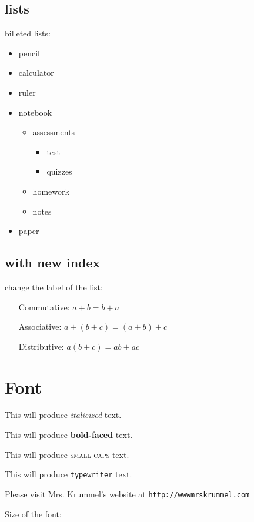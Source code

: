 \documentclass[11pt]{article}
\begin{document}
	\subsection{lists}
billeted lists: 
\begin{itemize}
	\item pencil
	\item calculator
	\item ruler
	\item notebook
		\begin{itemize}
			\item assessments
			\begin{itemize}
				\item test
				\item quizzes
			\end{itemize}
			\item homework
			\item notes
		\end{itemize}
	\item paper
\end{itemize}

	\subsection{with new index}
\begin{flushleft}
change the label of the list:
\end{flushleft}

\begin{enumerate}
\item[Commutative:] $a+b=b+a$
\item[Associative:] $a+(b+c)=(a+b)+c$
\item[Distributive: ] $a(b+c) = ab + ac$
\end{enumerate}


\section{Font}
This will produce  \textit{italicized} text.

This will produce  \textbf{bold-faced} text.

This will produce  \textsc{small caps} text.

This will produce  \texttt{typewriter} text.

Please visit Mrs. Krummel's website at \texttt{http://wwwmrskrummel.com}


\begin{flushleft}
Size of the font:
\end{flushleft}
\end{document}
